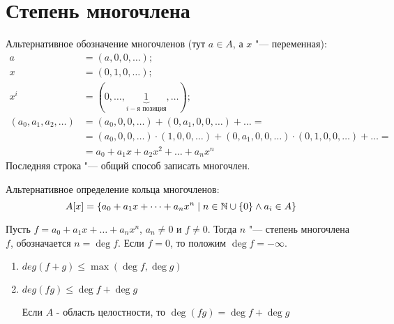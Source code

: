 \section{Степень многочлена}	
\begin{Rem}
	Альтернативное обозначение многочленов (тут $a \in A$, а $x$ "--- переменная):
	\begin{align*}
	a &= (a, 0, 0, \dots); \\
	x &= (0, 1, 0, \dots); \\
	x^i &= (0, \dots, \underbrace{1}_{i-\text{я позиция}}, \dots); \\
	(a_0, a_1, a_2, \dots) &= (a_0, 0, 0, \dots) + (0, a_1, 0, 0, \dots) + \dots =  \\
    &= (a_0, 0, 0, \dots) \cdot (1, 0, 0, \dots) + (0, a_1, 0, 0, \dots) \cdot (0, 1, 0, 0, \dots) + \dots = \\
    &= a_0 + a_1x + a_2x^2 + \dots + a_nx^n
	\end{align*}
	Последняя строка "--- общий способ записать многочлен.
\end{Rem}
	
\begin{Def}
	Альтернативное определение кольца многочленов:
	\[A[x] = \lbrace a_0 + a_1x + \dots + a_nx^n \mid n \in \mathbb{N} \cup \lbrace 0 \rbrace \wedge a_i \in A \rbrace\]
\end{Def}
	
\begin{Def}
	Пусть $f = a_0 + a_1x + \dots + a_nx^n$, $a_n \neq 0$ и $f \neq 0$.
	Тогда $n$ "--- степень многочлена $f$, обозначается $n = \deg f$.
	Если $f = 0$, то положим $\deg f = -\infty$.
\end{Def}
	 
\begin{theorem}{}
	\begin{enumerate}
	\item $deg(f + g) \leq \max(\deg f, \deg g)$
	\item $deg(fg)  \leq \deg f + \deg g$
	\begin{Rem}
		Если $A$ - область целостности, то $\deg (fg) = \deg f + \deg g$
	\end{Rem}
	\end{enumerate}		
\end{theorem}			 

